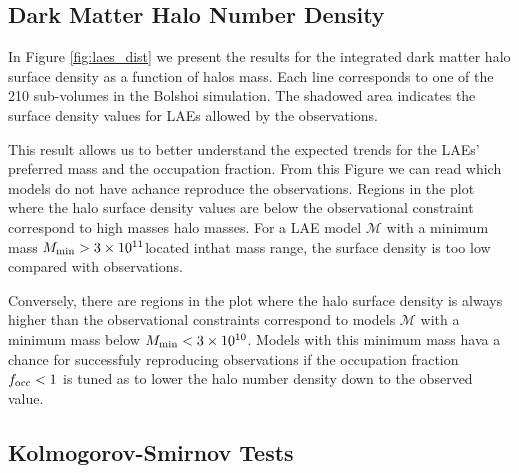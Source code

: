 \documentclass[usenatbib]{mn2e}
\newcommand{\hMsun}{{\ifmmode{h^{-1}{\rm {M_{\odot}}}}\else{$h^{-1}{\rm{M_{\odot}}}$}\fi}}
\begin{document}
\subsection{Dark Matter Halo Number Density}
In Figure \ref{fig:laes_dist} we present the results for  the
integrated dark matter halo surface density as a function of halos
mass. Each line corresponds to one of the 210 sub-volumes in the
Bolshoi simulation. The shadowed area indicates the surface density
values for LAEs allowed by the observations.  
 
This result allows us to better understand the expected trends for the
LAEs' preferred mass and the occupation fraction.  From this Figure we
can read which models do not have achance reproduce the
observations. Regions in the plot where the halo surface density
values are below the observational constraint correspond to high
masses halo masses. For a LAE model ${\mathcal M}$ with a minimum mass
$M_{\rm   min}> 3 \times 10^{11}$\hMsun located inthat mass range, the
surface density is too low compared with observations.   

Conversely, there are regions in the plot where the halo surface
density is always higher than the observational constraints correspond
to models ${\mathcal M}$ with a minimum mass below $M_{\rm min}<
3\times 10^{10}$\hMsun. Models with this minimum mass hava a chance
for successfuly reproducing observations if the occupation fraction
$f_{\rm occ}<1$ is tuned as to lower the halo number density down to
the observed value.    

\subsection{Kolmogorov-Smirnov Tests}
\end{document}
